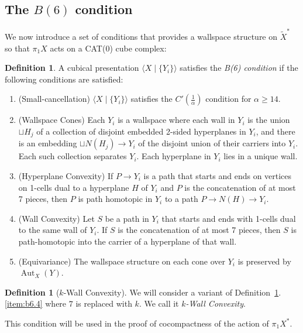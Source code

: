 \documentclass[12pt,oneside]{amsart}
\theoremstyle{definition}
\theoremstyle{definition}
\newtheorem{definition}[thm]{Definition}
\theoremstyle{remark}
\DeclareMathOperator{\Aut}{Aut}
\begin{document}
\subsection{The $B(6)$ condition}



We now introduce a  set of conditions that provides
a wallspace structure on $\widetilde X^*$ so that $\pi_1X$ acts on a CAT(0) cube complex:
\begin{definition}\label{def:b6}  A cubical presentation $\langle X \mid \{Y_i\} \rangle $ satisfies
the \emph{B(6) condition} if the following conditions are satisfied:

\begin{enumerate}
\item \label{item:b6.1}(Small-cancellation) $\langle X \mid \{Y_i\} \rangle$ satisfies the $C'(\frac{1}{\alpha})$ condition for $\alpha \geq 14$.
\item \label{item:b6.2} (Wallspace Cones) Each $Y_i$ is a wallspace where each wall in $Y_i$ is the union $\sqcup H_j$ of a collection of disjoint embedded 2-sided hyperplanes in $Y_i$, and there is an embedding $\sqcup N(H_j) \rightarrow Y_i$ of the disjoint union of their carriers into $Y_i$. Each such collection separates $Y_i$. Each hyperplane in $Y_i$ lies in a unique wall.
\item \label{item:b6.3} (Hyperplane Convexity) If $P \rightarrow Y_i$ is a path that starts and ends on vertices
on 1-cells dual to a hyperplane $H$ of $Y_i$ and $P$ is the concatenation of at most 7 pieces, then $P$ is path homotopic
in $Y_i$ to a path $P\rightarrow N(H) \rightarrow Y_i$.
\item \label{item:b6.4} (Wall Convexity) Let $S$ be a path in $Y_i$ that starts and ends with 1-cells
dual to the same wall of $Y_i$. If $S$ is the concatenation of at most 7 pieces, then $S$ is path-homotopic into the carrier of a hyperplane of that wall.
\item \label{item:b6.5} (Equivariance) The wallspace structure on each cone over $Y_i$ is preserved by $\Aut_X(Y)$. 
\end{enumerate}
\end{definition}

\begin{definition}[$k$-Wall Convexity]
    We will consider a variant of Definition~\ref{def:b6}.\eqref{item:b6.4} where $7$ is replaced with $k$. We call it \emph{$k$-Wall Convexity}.
\end{definition}
This condition will be used in the proof of cocompactness of the action of $\pi_1X^*$.
\end{document}
